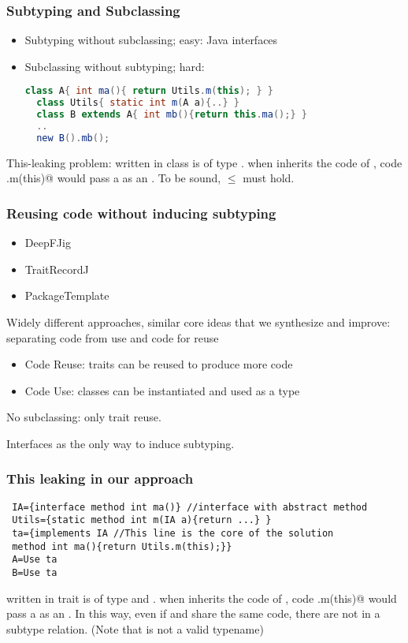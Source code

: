 
\begin{frame}[fragile]
\frametitle{Subtyping and Subclassing}

\begin{itemize}
\item Subtyping without subclassing;
easy: Java interfaces

\item Subclassing without subtyping;
hard:
\begin{lstlisting}[language=Java]
  class A{ int ma(){ return Utils.m(this); } }
  class Utils{ static int m(A a){..} }
  class B extends A{ int mb(){return this.ma();} }
  ..
  new B().mb();
\end{lstlisting}
\end{itemize}


This-leaking problem:
\Q@this@ written in class \Q@A@ is of type \Q@A@.
when \Q@B@ inherits the code of \Q@A@,
code \Q@Uitls.m(this)@ would pass a \Q@this@
as an \Q@A@. To be sound, 
\Q@B@ $\leq$ \Q@A@ must hold. 
\end{frame}



\begin{frame}[fragile]
\frametitle{Reusing code without inducing subtyping}

\begin{itemize}
\item DeepFJig
\item TraitRecordJ
\item PackageTemplate
\end{itemize}
Widely different approaches,
similar core ideas that we synthesize and improve:
separating code from use and code for reuse

\begin{itemize}
\item Code Reuse: traits can be reused to produce more code
\item Code Use: classes can be instantiated and used as a type
\end{itemize}

No subclassing: only trait reuse.

Interfaces as the only way to induce subtyping.
\end{frame}

\begin{frame}[fragile]
\frametitle{This leaking in our approach}

\begin{lstlisting}
 IA={interface method int ma()} //interface with abstract method
 Utils={static method int m(IA a){return ...} }
 ta={implements IA //This line is the core of the solution
 method int ma(){return Utils.m(this);}}
 A=Use ta
 B=Use ta
\end{lstlisting}

\Q@this@ written in trait \Q@ta@ is of type \Q@This@ and \Q@IA@.
when \Q@B@ inherits the code of \Q@ta@,
code \Q@Uitls.m(this)@ would pass a \Q@this@
as an \Q@IA@. In this way, even if
\Q@B@ and \Q@A@ share the same code, there
are not in a subtype relation.
(Note that \Q@t@ is not a valid typename)
\end{frame}

